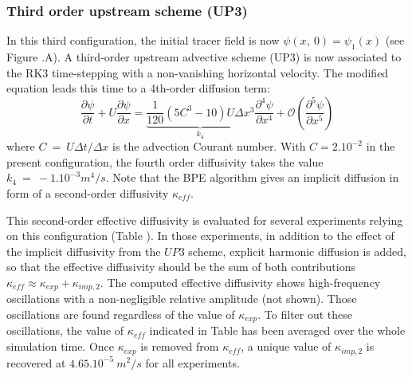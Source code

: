 \subsubsection{Third order upstream scheme (UP3)}
In this third configuration, the initial tracer field is now $\psi(x,\ 0)=\psi_1(x)$ (see Figure .A).
A third-order upstream advective scheme (UP3) is now associated to the RK3 time-stepping with a non-vanishing horizontal velocity. The modified equation leads this time to a 4th-order diffusion term:
\begin{equation}
\frac{\partial \psi}{\partial t}+U \frac{\partial \psi}{\partial x} = \underbrace{\frac{1}{120}(5 C^3-10) U \Delta x^3}_{k_4}  \frac{\partial^4 \psi}{\partial x^4} + \mathcal{O}(\frac{\partial^5 \psi}{\partial x^5})
\end{equation}
where $C\ =\ U\Delta t/\Delta x$ is the advection Courant number. With $C=2 . 10^{-2}$ in the present configuration, the fourth order diffusivity takes the value $k_4\ =\ -1.10^{-3} m^4/s$. Note that the BPE algorithm gives an implicit diffusion in form of a second-order diffusivity $\kappa_{eff}$.

This second-order effective diffusivity is evaluated for several experiments relying on this configuration (Table ). In those experiments, in addition to the effect of the implicit diffusivity from the $UP3$ scheme, explicit harmonic diffusion is added, so that the effective diffusivity should be the sum of both contributions $\kappa_{eff} \approx \kappa_{exp} + \kappa_{imp,2}$.
The computed effective diffusivity shows high-frequency oscillations with a non-negligible relative amplitude (not shown). Those oscillations are found regardless of the value of $\kappa_{exp}$. To filter out these oscillations, the value of $\kappa_{eff}$ indicated in Table  has been averaged over the whole simulation time. %
Once $\kappa_{exp}$ is removed from $\kappa_{eff}$, a unique value of $\kappa_{imp,2}$ is recovered at $4.65.10^{-5}\ m^2/s$ for all experiments.

